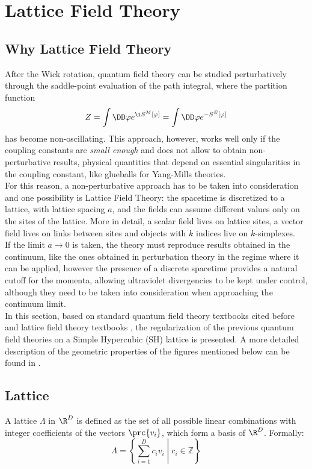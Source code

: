 \section{Lattice Field Theory}
\subsection{Why Lattice Field Theory}
After the Wick rotation, quantum field theory can be studied perturbatively through the saddle-point evaluation of the path integral, where the partition function
\begin{equation*}
    Z = \int\DD\varphi e^{\i S^M[\varphi]} = \int\DD\varphi e^{-S^E[\varphi]}
\end{equation*}
has become non-oscillating.
This approach, however, works well only if the coupling constants are \emph{small enough} and does not allow to obtain non-perturbative results, \ie physical quantities that depend on essential singularities in the coupling constant, like glueballs for Yang-Mills theories.\\
For this reason, a non-perturbative approach has to be taken into consideration and one possibility is Lattice Field Theory: the spacetime is discretized to a lattice, with lattice spacing $a$, and the fields can assume different values only on the sites of the lattice.
More in detail, a scalar field lives on lattice sites, a vector field lives on links between sites and objects with $k$ indices live on $k$-simplexes.\\
If the limit $a\to0$ is taken, the theory must reproduce results obtained in the continuum, like the ones obtained in perturbation theory in the regime where it can be applied, however the presence of a discrete spacetime provides a natural cutoff for the momenta, allowing ultraviolet divergencies to be kept under control, although they need to be taken into consideration when approaching the continuum limit.\\
In this section, based on standard quantum field theory textbooks cited before and lattice field theory textbooks \cite{Montvay:1994cy, Gattringer:2010zz, DeGrand:2006zz}, the regularization of the previous quantum field theories on a Simple Hypercubic (SH) lattice is presented.
A more detailed description of the geometric properties of the figures mentioned below can be found in \cite{coxeter2012regular}.
\subsection{Lattice}
A lattice $\Lambda$ in $\R^D$ is defined as the set of all possible linear combinations with integer coefficients of the vectors $\prc{v_i}$, which form a basis of $\R^D$.
Formally:
\begin{equation}
    \Lambda =\left\{\left.\sum _{i=1}^{D}c_{i}v_{i}\;\right\vert \;c_{i}\in \mathbb {Z} \right\} \label{1:genericLattice}
\end{equation}

